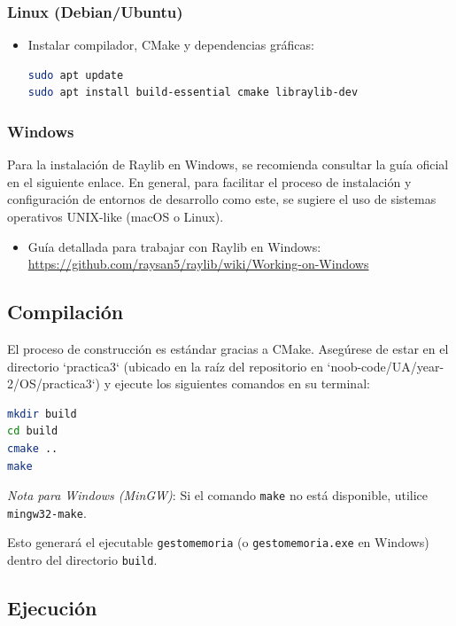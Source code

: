 \documentclass[11pt,a4paper]{article}
\begin{document}
\subsubsection{Linux (Debian/Ubuntu)}
\begin{itemize}
    \item Instalar compilador, CMake y dependencias gráficas:
    \begin{lstlisting}[language=bash]
sudo apt update
sudo apt install build-essential cmake libraylib-dev
    \end{lstlisting}
\end{itemize}

\subsubsection{Windows}
Para la instalación de Raylib en Windows, se recomienda consultar la guía oficial en el siguiente enlace. En general, para facilitar el proceso de instalación y configuración de entornos de desarrollo como este, se sugiere el uso de sistemas operativos UNIX-like (macOS o Linux).

\begin{itemize}
    \item Guía detallada para trabajar con Raylib en Windows: \url{https://github.com/raysan5/raylib/wiki/Working-on-Windows}
\end{itemize}

\subsection{Compilación}

El proceso de construcción es estándar gracias a CMake. Asegúrese de estar en el directorio `practica3` (ubicado en la raíz del repositorio en 
`noob-code/UA/year-2/OS/practica3`) y ejecute los siguientes comandos en su terminal:

\begin{lstlisting}[language=bash, caption={Comandos de construcción}]
mkdir build
cd build
cmake ..
make
\end{lstlisting}

\textit{Nota para Windows (MinGW)}: Si el comando \texttt{make} no está disponible, utilice \texttt{mingw32-make}.

Esto generará el ejecutable \texttt{gestomemoria} (o \texttt{gestomemoria.exe} en Windows) dentro del directorio \texttt{build}.

\subsection{Ejecución}
\end{document}
